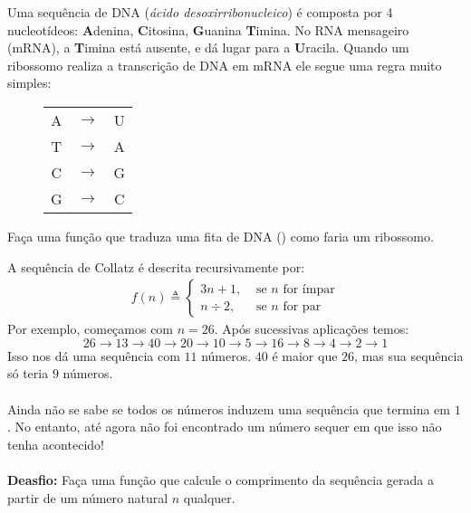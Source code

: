 \documentclass[12pt]{article}
\begin{document}

	
		Uma sequência de DNA (\emph{ácido desoxirribonucleico}) é composta por 4 nucleotídeos: \textbf{A}denina, \textbf{C}itosina, \textbf{G}uanina \textbf{T}imina. No RNA mensageiro (mRNA), a \textbf{T}imina está ausente, e dá lugar para a \textbf{U}racila. Quando um ribossomo realiza a transcrição de DNA em mRNA ele segue uma regra muito simples:
		
		\begin{figure}[H]
			\begin{center}
				\large		
				\begin{tabular}{ccc}
					A & $\rightarrow$ & U\\
					T & $\rightarrow$ & A\\
					C & $\rightarrow$ & G\\
					G & $\rightarrow$ & C\\
				\end{tabular}
			\end{center}
		\end{figure}
	Faça uma função que traduza uma fita de DNA () como faria um ribossomo.
	
	\problem[2]{}
	
	
	
	
	
	
	A sequência de Collatz é descrita recursivamente por:
	{\large
	\begin{align*}
		f(n) \triangleq \begin{cases}
		3n + 1, &\text{ se } n \text{ for ímpar}\\
		n \div 2, &\text{ se } n \text{ for par}
		\end{cases}
	\end{align*}
	}
	Por exemplo, começamos com $n = 26$. Após sucessivas aplicações temos:
		$$26 \to 13 \to 40 \to 20 \to 10 \to 5 \to 16 \to 8 \to 4 \to 2 \to 1$$
	Isso nos dá uma sequência com $11$ números. $40$ é maior que $26$, mas sua sequência só teria $9$ números.\\
	\\
	Ainda não se sabe se todos os números induzem uma sequência que termina em $1$. No entanto, até agora não foi encontrado um número sequer em que isso não tenha acontecido!\\
	\\
	\textbf{Deasfio: } Faça uma função que calcule o comprimento da sequência gerada a partir de um número natural $n$ qualquer.
	
	
	
	
	
\end{document}
